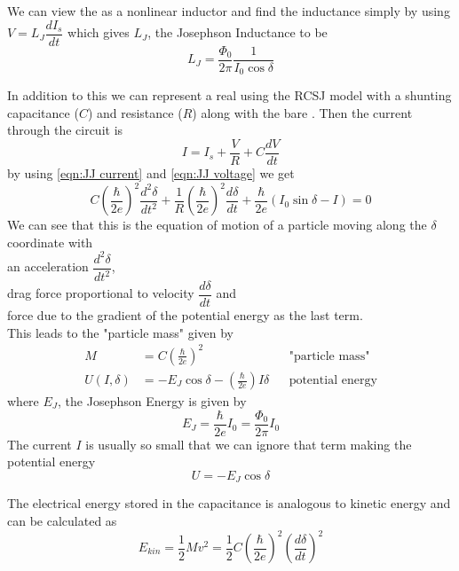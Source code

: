 We can view the \JJ as a nonlinear inductor and find the inductance simply by using $V=L_J\dfrac{dI_s}{dt}$ which gives $L_J$, the Josephson Inductance to be
\begin{equation}
L_J=\frac{\Phi_0}{2\pi}\frac{1}{I_0\cos\delta}
\end{equation}

In addition to this we can represent a real \JJ using the RCSJ model with a shunting capacitance ($C$) and resistance ($R$) along with the bare \JJ \cite{Harmans1997}. Then the current through the circuit is
\begin{equation}
I=I_s+\frac{V}{R}+C\frac{dV}{dt}
\end{equation}
by using \ref{eqn:JJ current} and \ref{eqn:JJ voltage} we get
\begin{equation}
C\left(\frac{\hbar}{2e}\right)^2\frac{d^2\delta}{dt^2}+\frac{1}{R}\left(\frac{\hbar}{2e}\right)^2\frac{d\delta}{dt}+\frac{\hbar}{2e}(I_0\sin\delta-I)=0
\end{equation}
We can see that this is the equation of motion of a particle moving along the $\delta$ coordinate with\\ an acceleration $\dfrac{d^2\delta}{dt^2}$,\\ drag force proportional to velocity $\dfrac{d\delta}{dt}$ and\\ force due to the gradient of the potential energy as the last term.\\
This leads to the "particle mass" given by
\begin{align}
M&=C\left(\frac{\hbar}{2e}\right)^2&&\text{"particle mass"}\\
U(I,\delta)&=-E_J\cos\delta-\left(\frac{\hbar}{2e}\right)I\delta&&\text{potential energy}
\end{align}
where $E_J$, the Josephson Energy is given by
\begin{equation}
E_J=\frac{\hbar}{2e}I_0=\frac{\Phi_0}{2\pi}I_0
\label{eqn:junction energy}
\end{equation}
The current $I$ is usually so small that we can ignore that term making the potential energy
\begin{equation}
U=-E_J\cos\delta
\label{eqn:JJ potential energy}
\end{equation}

The electrical energy stored in the capacitance is analogous to kinetic energy and can be calculated as
\begin{equation}
E_{kin}=\frac{1}{2}Mv^2=\frac{1}{2}C\left(\frac{\hbar}{2e}\right)^2\left(\frac{d\delta}{dt}\right)^2
\end{equation}

